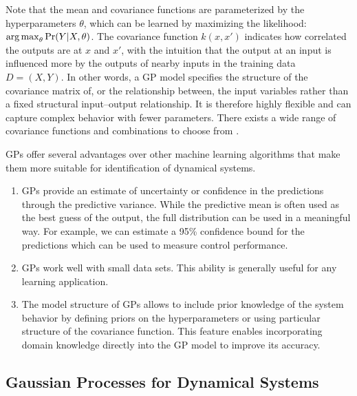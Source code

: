 Note that the mean and covariance functions are parameterized by the hyperparameters $\theta$, which can be learned by maximizing the likelihood: \(\operatorname*{arg\,max}_\theta \Pr(Y \vert X, \theta)\).
The covariance function \(k(x,x')\) indicates how correlated the outputs are at \(x\) and \(x'\), with the intuition that the output at an input is influenced more by the outputs of nearby inputs in the training data $D = (X, Y)$.
In other words, a GP model specifies the structure of the covariance matrix of, or the relationship between, the input variables rather than a fixed structural input--output relationship.
It is therefore highly flexible and can capture complex behavior with fewer parameters.
There exists a wide range of covariance functions and combinations to choose from \cite{Rasmussen2006}. 

GPs offer several advantages over other machine learning algorithms that make them more suitable for identification of dynamical systems.
\begin{enumerate}
\item GPs provide an estimate of uncertainty or confidence in the
  predictions through the predictive variance.  While the predictive mean is often used as the best guess of the output, the full distribution can be used in a meaningful way. For example, we can estimate a 95\% confidence bound for the predictions which can be used to measure control performance.
\item GPs work well with small data sets.  This ability is generally useful for any learning application.
\item The model structure of GPs allows to include prior knowledge of the system behavior by defining priors on the hyperparameters or using particular structure of the covariance function.  This feature enables incorporating domain knowledge directly into the GP model to improve its accuracy.
\end{enumerate}

\subsection{Gaussian Processes for Dynamical Systems}
\label{S:intro-gp:control}

